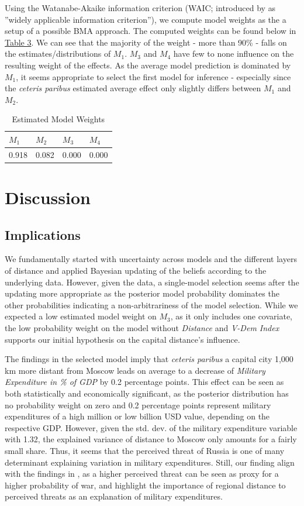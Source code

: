 \documentclass[12pt,a4paper]{article}
\begin{document}
Using the Watanabe-Akaike information criterion (WAIC; introduced by \citealp{watanabe2010} as ''widely applicable information criterion''), we compute model weights as the a setup of a possible BMA approach. The computed weights can be found below in \hyperref[T:3]{\color{blue}Table 3}. We can see that the majority of the weight - more than 90\% - falls on the estimates/distributions of $M_1$. $M_3$ and $M_4$ have few to none influence on the resulting weight of the effects. As the average model prediction is dominated by $M_1$, it seems appropriate to select the first model for inference - especially since the \textit{ceteris paribus} estimated average effect only slightly differs between $M_1$ and $M_2$.
\begin{table}[!htbp] \centering 
  \caption{Estimated Model Weights} 
  \label{T:3} 
\begin{tabular}{llll}
\hline \hline
$M_1$& $M_2$ & $M_3$& $M_4$\\ \hline
0.918 & 0.082 & 0.000 & 0.000 \\ \hline \hline
\end{tabular}
\end{table}
 

\section{Discussion}
\subsection{Implications}
We fundamentally started with uncertainty across models and the different layers of distance and applied Bayesian updating of the beliefs according to the underlying data. However, given the data, a single-model selection seems after the updating more appropriate as the posterior model probability dominates the other probabilities indicating a non-arbitrariness of the model selection. While we expected a low estimated model weight on $M_3$, as it only includes one covariate, the low probability weight on the model without \textit{Distance} and \textit{V-Dem Index} supports our initial hypothesis on the capital distance's influence. \clearpage

The findings in the selected model imply that \textit{ceteris paribus} a capital city 1,000 km more distant from Moscow leads on average to a decrease of \textit{Military Expenditure in \% of GDP} by 0.2 percentage points. This effect can be seen as both statistically and economically significant, as the posterior distribution has no probability weight on zero and 0.2 percentage points represent military expenditures of a high million or low billion USD value, depending on the respective GDP. However, given the std. dev. of the military expenditure variable with 1.32, the explained variance of distance to Moscow only amounts for a fairly small share. Thus, it seems that the perceived threat of Russia is one of many determinant explaining variation in military expenditures. Still, our finding align with the findings in \citet{nordhaus2012}, as a higher perceived threat can be seen as proxy for a higher probability of war, and highlight the importance of regional distance to perceived threats as an explanation of military expenditures. 
\end{document}
